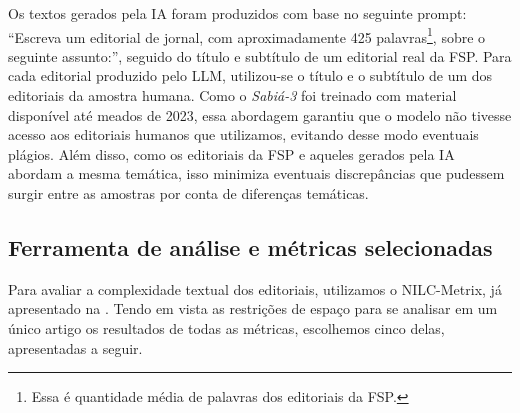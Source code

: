 \documentclass[portuguese]{textolivre}
\begin{document}
Os textos gerados pela IA foram produzidos com base no seguinte prompt: ``Escreva um editorial de jornal, com aproximadamente 425 palavras\footnote{Essa é quantidade média de palavras dos editoriais da FSP.}, sobre o seguinte assunto:'', seguido do título e subtítulo de um editorial real da FSP.
Para cada editorial produzido pelo LLM, utilizou-se o título e o subtítulo de um dos editoriais da amostra humana.
Como o \emph{Sabiá-3} foi treinado com material disponível até meados de 2023, essa abordagem garantiu que o modelo não tivesse acesso aos editoriais humanos que utilizamos, evitando desse modo eventuais plágios.
Além disso, como os editoriais da FSP e aqueles gerados pela IA abordam a mesma temática, isso minimiza eventuais discrepâncias que pudessem surgir entre as amostras por conta de diferenças temáticas.

\subsection{Ferramenta de análise e métricas selecionadas}\label{sec-ferramenta}
Para avaliar a complexidade textual dos editoriais, utilizamos o NILC-Metrix, já apresentado na .
Tendo em vista as restrições de espaço para se analisar em um único artigo os resultados de todas as métricas, escolhemos cinco delas, apresentadas a seguir.
\end{document}
